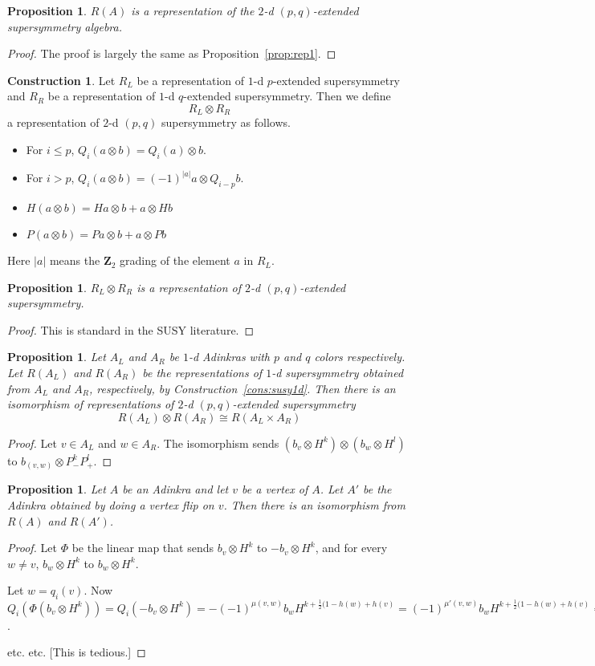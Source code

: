 \documentclass[12pt,twoside,singlespace]{article}
\numberwithin{equation}{section}
\newtheorem{prop}[equation]{Proposition}
\theoremstyle{definition}
\newtheorem{construction}[equation]{Construction}
\newcommand{\ZZ}{\mathbf{Z}}
\begin{document}
\begin{prop}
\label{prop:rep2}
$R(A)$ is a representation of the $2$-d $(p,q)$-extended supersymmetry algebra.
\end{prop}
\begin{proof}
The proof is largely the same as Proposition~\ref{prop:rep1}.
\end{proof}

\begin{construction}
Let $R_L$ be a representation of $1$-d $p$-extended supersymmetry and $R_R$ be a representation of $1$-d $q$-extended supersymmetry.  Then we define
\[R_L\otimes R_R\]
a representation of $2$-d $(p,q)$ supersymmetry as follows.
\begin{itemize}
\item For $i\le p$, $Q_i(a\otimes b)=Q_i(a)\otimes b$.
\item For $i>p$, $Q_i(a\otimes b)=(-1)^{|a|}a\otimes Q_{i-p} b$.
\item $H(a\otimes b)=H a\otimes b + a\otimes Hb$
\item $P(a\otimes b)=Pa \otimes b + a\otimes Pb$
\end{itemize}
Here $|a|$ means the $\ZZ_2$ grading of the element $a$ in $R_L$.
\end{construction}

\begin{prop}
$R_L\otimes R_R$ is a representation of $2$-d $(p,q)$-extended supersymmetry.
\end{prop}
\begin{proof}
This is standard in the SUSY literature.
\end{proof}

\begin{prop}
Let $A_L$ and $A_R$ be $1$-d Adinkras with $p$ and $q$ colors respectively.  Let $R(A_L)$ and $R(A_R)$ be the representations of $1$-d supersymmetry obtained from $A_L$ and $A_R$, respectively, by Construction~\ref{cons:susy1d}.  Then there is an isomorphism of representations of $2$-d $(p,q)$-extended supersymmetry
\[R(A_L)\otimes R(A_R) \cong R(A_L\times A_R)\]
\end{prop}
\begin{proof}
Let $v\in A_L$ and $w\in A_R$.  The isomorphism sends $(b_v\otimes H^k)\otimes (b_w\otimes H^l)$ to $b_{(v,w)}\otimes P_-^{k}P_+^l$.
\end{proof}

\begin{prop}
Let $A$ be an Adinkra and let $v$ be a vertex of $A$.  Let $A'$ be the Adinkra obtained by doing a vertex flip on $v$.  Then there is an isomorphism from $R(A)$ and $R(A')$.
\end{prop}
\begin{proof}
Let $\Phi$ be the linear map that sends $b_v\otimes H^k$ to $-b_v\otimes H^k$, and for every $w\not=v$, $b_w\otimes H^k$ to $b_w\otimes H^k$.

Let $w=q_i(v)$.  Now $Q_i(\Phi(b_v\otimes H^k))=Q_i(-b_v\otimes H^k)=-(-1)^{\mu(v,w)}b_w H^{k+\frac12(1-h(w)+h(v)}=(-1)^{\mu'(v,w)}b_w H^{k+\frac12(1-h(w)+h(v)}=\Phi(Q_i(b_v\otimes H^k))$.

etc. etc. [This is tedious.]
\end{proof}
\end{document}
